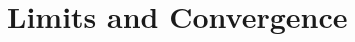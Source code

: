\documentclass[british,11pt,a4paper]{report}
\begin{document}
\maketitle
\tableofcontents
\chapter{Limits and Convergence}

\end{document}
